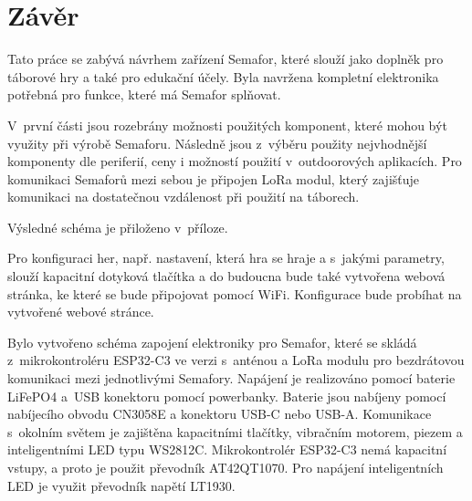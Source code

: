 \chapter*{Závěr}
{}

Tato práce se zabývá návrhem zařízení Semafor, které slouží jako doplněk pro táborové hry a také pro edukační účely. Byla navržena kompletní 
elektronika potřebná pro funkce, které má Semafor splňovat. 

V~první části jsou rozebrány možnosti použitých komponent, které mohou být využity při výrobě Semaforu. Následně jsou z~výběru použity 
nejvhodnější komponenty dle periferií, ceny i možností použití v~outdoorových aplikacích.
Pro komunikaci Semaforů mezi sebou je připojen LoRa modul, který zajišťuje komunikaci na dostatečnou vzdálenost při použití na táborech. 

Výsledné schéma je přiloženo v~příloze. 

Pro konfiguraci her, např. nastavení, která hra se hraje a s~jakými parametry, slouží kapacitní dotyková tlačítka a do budoucna bude také 
vytvořena webová stránka, ke které se bude připojovat pomocí WiFi. Konfigurace bude probíhat na vytvořené webové stránce. 

Bylo vytvořeno schéma zapojení elektroniky pro Semafor, které se skládá z~mikrokontroléru ESP32-C3 ve verzi s~anténou a LoRa modulu pro 
bezdrátovou komunikaci mezi jednotlivými Semafory. Napájení je realizováno pomocí baterie LiFePO4 a~USB konektoru pomocí powerbanky. Baterie 
jsou nabíjeny pomocí nabíjecího obvodu CN3058E a konektoru USB-C nebo USB-A. Komunikace s~okolním světem je zajištěna kapacitními tlačítky, 
vibračním motorem, piezem a inteligentními LED typu WS2812C. Mikrokontrolér ESP32-C3 nemá kapacitní vstupy, a proto je použit převodník AT42QT1070.
Pro napájení inteligentních LED je využit převodník napětí LT1930. 

